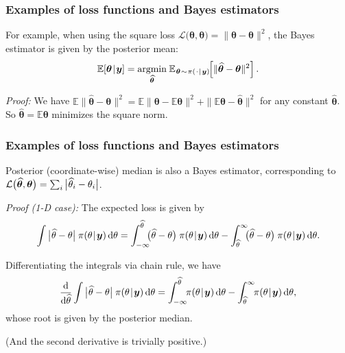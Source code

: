\documentclass[18pt]{beamer}
\newcommand{\defineTightSpacing}{%
	\setlength{\abovedisplayskip}{.25\baselineskip}%
	\setlength{\belowdisplayskip}{.25\baselineskip}%
}
\renewcommand{\textsc}[1]{{\small \MakeUppercase{#1}}}
\newcommand{\given}{\thinnerspace | \thinnerspace}
\newcommand{\diff}{\operatorname{\mathrm{d}}\!{}}
\DeclareMathOperator*{\argmin}{argmin}
\newcommand{\thinnerspace}{\mskip.5\thinmuskip}
\newcommand{\thinnestspace}{\mskip.25\thinmuskip}
\newcommand{\expectation}{\mathbb{E}}
\newcommand{\density}{\operatorname{\pi}}
\newcommand{\by}{\bm{y}}
\newcommand{\btheta}{\bm{\theta}}
\newcommand{\loss}{\mathcal{L}}
\begin{document}
\begin{frame}
\frametitle{Examples of loss functions and Bayes estimators}
\smallskip
For example, when using the square loss $\loss\big(\widehat{\btheta}, \btheta \big) = \| \widehat{\btheta} - \btheta\|^2$, the Bayes estimator is given by the posterior mean:
\begin{equation*} \defineTightSpacing%
\expectation\!\left[ \btheta \given \by \right] =
	\argmin_{\widehat{\btheta}} \thinnerspace \expectation_{\thinnerspace \btheta \thinnerspace \sim \thinnerspace \density(\thinnerspace \cdot \given \by)\!}\!\left[
		 \| \widehat{\btheta} - \btheta\|^2
	\right].
\end{equation*}

\pause
\textit{Proof:} We have $\expectation \| \widehat{\btheta} - \btheta \|^2 = \expectation \| \btheta - \expectation \btheta \|^2 + \| \expectation \btheta - \widehat{\btheta} \|^2$ for any constant $\widehat{\btheta}$. 
So $\widehat{\btheta} = \expectation \btheta$ minimizes the square norm. \hfill \qedsymbol
\end{frame}


\begin{frame}
\frametitle{Examples of loss functions and Bayes estimators}
Posterior (coordinate-wise) median is also a Bayes estimator, corresponding to $\loss\big(\widehat{\btheta}, \btheta \big) = \sum_i \big| \thinnestspace \widehat{\theta}_i - \theta_i \big|$.

\pause
\smallskip
\textit{Proof (1-\textsc{D} case):} 
The expected loss is given by
\begin{equation*} \defineTightSpacing%
\int \big| \thinnestspace \widehat{\theta} - \theta \big| \thinnerspace \density(\theta \given \by) \diff \theta
	= \int_{-\infty}^{\widehat{\theta}} \!\!\! \big( \widehat{\theta} - \theta \big) \thinnerspace \density(\theta \given \by) \diff \theta
		- \int_{\widehat{\theta}}^\infty \!\!\! \big( \widehat{\theta} - \theta \big) \thinnerspace \density(\theta \given \by) \diff \theta.
\end{equation*}

\pause
Differentiating the integrals via chain rule, we have
\begin{equation*} \defineTightSpacing%
\frac{\diff}{\diff \widehat{\theta}} \int \big| \thinnestspace \widehat{\theta} - \theta \big| \thinnerspace \density(\theta \given \by) \diff \theta
	= \int_{-\infty}^{\widehat{\theta}} \!\! \density(\theta \given \by) \diff \theta
		- \int_{\widehat{\theta}}^\infty \!\! \density(\theta \given \by) \diff \theta,
\end{equation*}
whose root is given by the posterior median.

\pause
(And the second derivative is trivially positive.) \hfill \qedsymbol
\end{frame}
\end{document}
